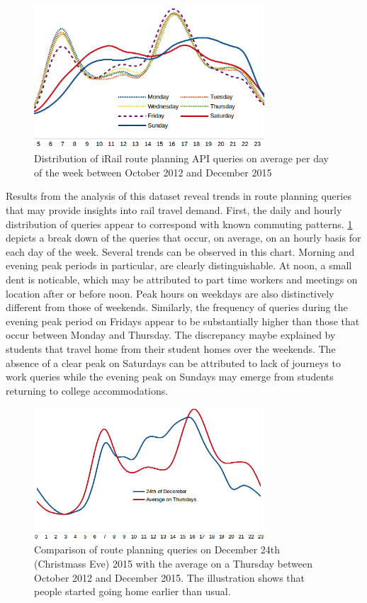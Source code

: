 \documentclass{sig-alternate}
\begin{document}
\begin{figure}
\centering
\includegraphics[width=8.6cm]{avg-all}
\caption{Distribution of iRail route planning API queries on average per day of the week between October 2012 and December 2015}
\label{fig:average}
\end{figure}

Results from the analysis of this dataset reveal trends in route planning queries that may provide insights into rail travel demand. 
First, the daily and hourly distribution of queries appear to correspond with known commuting patterns. 
\cref{fig:average} depicts a break down of the queries that occur, on average, on an hourly basis for each day of the week.
Several trends can be observed in this chart. 
Morning and evening peak periods in particular, are clearly distinguishable.
At noon, a small dent is noticable, which may be attributed to part time workers and meetings on location after or before noon.
Peak hours on weekdays are also distinctively different from those of weekends.
Similarly, the frequency of queries during the evening peak period on Fridays appear to be substantially higher than those that occur between Monday and Thursday.
The discrepancy maybe explained by students that travel home from their student homes over the weekends. 
The absence of a clear peak on Saturdays can be attributed to lack of journeys to work queries while the evening peak on Sundays may emerge from students returning to college accommodations.

\begin{figure}
\centering
\includegraphics[width=8.6cm]{dec24}
\caption{Comparison of route planning queries on December 24th (Christmass Eve) 2015 with the average on a Thursday between October 2012 and December 2015. The illustration shows that people started going home earlier than usual.}
\label{fig:dec24}
\end{figure}
\end{document}
